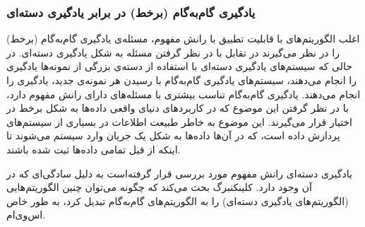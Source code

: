 \subsubsection{
یادگیری گام‌به‌گام (برخط) در برابر یادگیری دسته‌ای
}
اغلب الگوریتم‌های با قابلیت تطبیق با رانش مفهوم، مسئله‌ی یادگیری گام‌به‌گام
(برخط) را در نظر می‌گیرند در تقابل با در نظر گرفتن مسئله به شکل یادگیری دسته‌ای. در حالی که سیستم‌های یادگیری دسته‌ای با استفاده از دسته‌ی بزرگی از نمونه‌ها یادگیری را انجام می‌دهند، سیستم‌های یادگیری گام‌به‌گام با رسیدن هر نمونه‌ی جدید، یادگیری را انجام می‌دهند. یادگیری گام‌به‌گام تناسب بیشتری با مسئله‌های دارای رانش مفهوم دارد، با در نظر گرفتن این موضوع که در کاربردهای دنیای واقعی داده‌ها به شکل برخط در اختیار قرار می‌گیرند. این موضوع به خاطر طبیعت اطلاعات در بسیاری از سیستم‌های پردازش داده است، که در آن‌ها داده‌ها به شکل یک جریان وارد سیستم می‌شوند تا اینکه از قبل تمامی داده‌ها ثبت شده باشند.
\cite{streetkim2001} \cite{wangetal2003} \cite{hultenetal2001}


یادگیری دسته‌ای رانش مفهوم مورد بررسی قرار گرفته‌است به دلیل سادگی‌ای که در آن وجود دارد.
\cite{harriessammut1998} \cite{klinkenberg2004} 
کلینکنبرگ بحث می‌کند که چگونه می‌توان چنین الگوریتم‌هایی (الگوریتم‌های یادگیری دسته‌ای) را به الگوریتم‌های گام‌به‌گام تبدیل کرد، به طور خاص اس‌وی‌ام.


